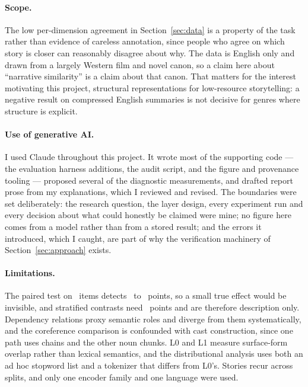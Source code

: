 \documentclass[11pt,letterpaper,twocolumn]{article}
\begin{document}
\paragraph{Scope.} The low per-dimension agreement in Section~\ref{sec:data} is
a property of the task rather than evidence of careless annotation, since
people who agree on which story is closer can reasonably disagree about why.
The data is English only and drawn from a largely Western film and novel canon,
so a claim here about ``narrative similarity'' is a claim about that canon.
That matters for the interest motivating this project, structural
representations for low-resource storytelling: a negative result on compressed
English summaries is not decisive for genres where structure is explicit.

\paragraph{Use of generative AI.} I used Claude throughout this project. It wrote most of the supporting code ---
the evaluation harness additions, the audit script, and the figure and
provenance tooling --- proposed several of the diagnostic measurements, and
drafted report prose from my explanations, which I reviewed and revised. The
boundaries were set deliberately: the research question, the layer design,
every experiment run and every decision about what could honestly be claimed
were mine; no figure here comes from a model rather than from a stored result;
and the errors it introduced, which I caught, are part of why the verification
machinery of Section~\ref{sec:approach} exists.

\paragraph{Limitations.} The paired test on \TestN\ items detects
\PowerPairedLo\ to \PowerPairedHi\ points, so a small true effect would be
invisible, and stratified contrasts need \PowerStrataMDE\ points and are
therefore description only. Dependency relations proxy semantic roles and
diverge from them systematically, and the coreference comparison is confounded
with cast construction, since one path uses chains and the other noun chunks.
L0 and L1 measure surface-form overlap rather than lexical semantics, and the
distributional analysis uses both an ad hoc stopword list and a tokenizer that
differs from L0's. Stories recur across
splits, and only one encoder family and one language were used.
\end{document}
